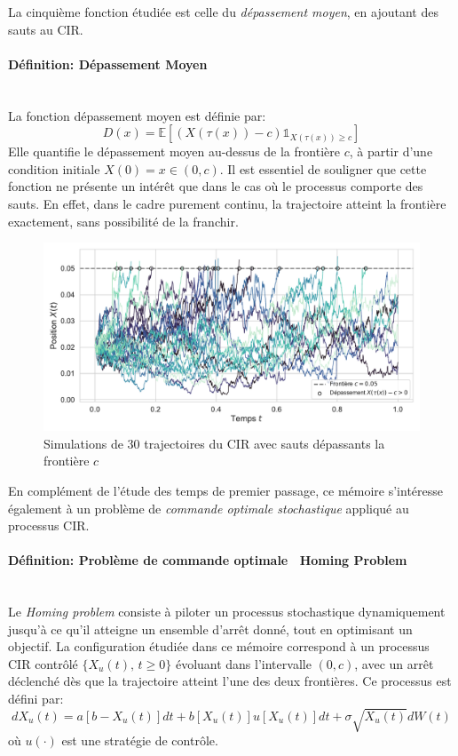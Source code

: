 La cinquième fonction étudiée est celle du \textit{dépassement moyen}, en ajoutant des sauts au \acs{CIR}.
\paragraph{Définition: Dépassement Moyen}\mbox{}\\
La fonction dépassement moyen est définie par: 
\begin{equation}\label{overshoot}
    D(x)=\mathds{E}\left[(X(\tau(x))-c)\mathds1_{X(\tau(x))\geq c}\right]
\end{equation}
Elle quantifie le dépassement moyen au-dessus de la frontière \( c \), à partir d'une condition initiale \( X(0) = x \in (0, c) \). Il est essentiel de souligner que cette fonction ne présente un intérêt que dans le cas où le processus comporte des sauts. En effet, dans le cadre purement continu, la trajectoire atteint la frontière exactement, sans possibilité de la franchir.
\begin{figure}[htb]
    \centering
    \includegraphics[width=0.9\linewidth]{img/intro/overshoot.pdf}
    \caption{Simulations de 30 trajectoires du \acs{CIR} avec sauts dépassants la frontière $c$}\label{fig:OvershootViz}
\end{figure}
\FloatBarrier En complément de l'étude des temps de premier passage, ce mémoire s'intéresse également à un problème de \textit{commande optimale stochastique} appliqué au processus \acs{CIR}.\\
\paragraph{Définition: Problème de commande optimale \textemdash~Homing Problem}\label{definition_optimal_control}\mbox{}\\
Le \textit{Homing problem} consiste à piloter un processus stochastique dynamiquement jusqu'à ce qu'il atteigne un ensemble d'arrêt donné, tout en optimisant un objectif. La configuration étudiée dans ce mémoire correspond à un processus \acs{CIR} contrôlé \( \{X_u(t),\, t \geq 0\} \) évoluant dans l'intervalle \( (0, c) \), avec un arrêt déclenché dès que la trajectoire atteint l'une des deux frontières. Ce processus est défini par:
\begin{equation}\label{controlled_process}
    dX_u(t) = a[b - X_u(t)]dt + b[X_u(t)]u[X_u(t)]dt + \sigma \sqrt{X_u(t)} dW(t)
\end{equation}
où \( u(\cdot) \) est une stratégie de contrôle.

